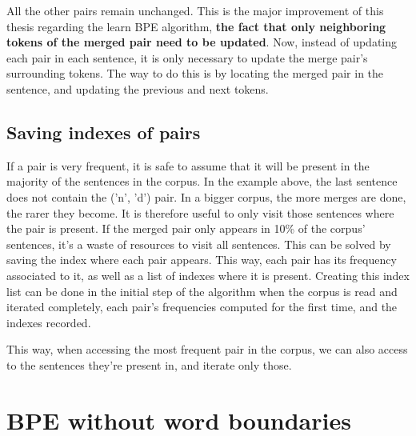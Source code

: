 All the other pairs remain unchanged. This is the major improvement of this thesis regarding the learn BPE algorithm, \textbf{the fact that only neighboring tokens of the merged pair need to be updated}. Now, instead of updating each pair in each sentence, it is only necessary to update the merge pair's surrounding tokens. The way to do this is by locating the merged pair in the sentence, and updating the previous and next tokens.

\subsection{Saving indexes of pairs}

If a pair is very frequent, it is safe to assume that it will be present in the majority of the sentences in the corpus. In the example above, the last sentence does not contain the ('n', 'd') pair. In a bigger corpus, the more merges are done, the rarer they become. It is therefore useful to only visit those sentences where the pair is present. If the merged pair only appears in 10\% of the corpus' sentences, it's a waste of resources to visit all sentences. This can be solved by saving the index where each pair appears. This way, each pair has its frequency associated to it, as well as a list of indexes where it is present. Creating this index list can be done in the initial step of the algorithm when the corpus is read and iterated completely, each pair's frequencies computed for the first time, and the indexes recorded.

This way, when accessing the most frequent pair in the corpus, we can also access to the sentences they're present in, and iterate only those.

\section{BPE without word boundaries}

